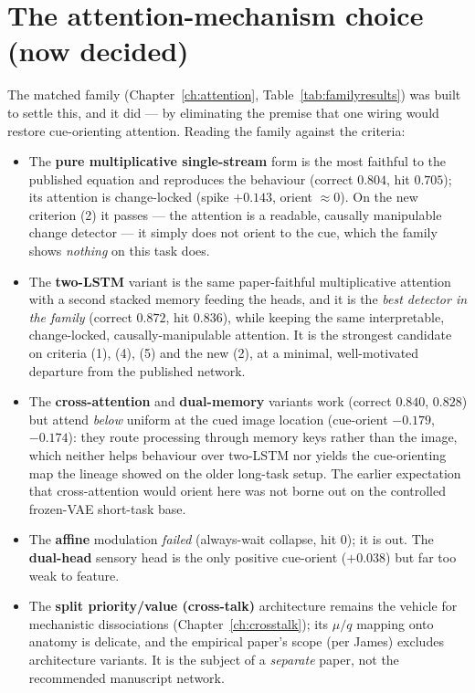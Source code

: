 \section{The attention-mechanism choice (now decided)}
The matched family (Chapter~\ref{ch:attention}, Table~\ref{tab:familyresults}) was built to
settle this, and it did --- by eliminating the premise that one wiring would restore
cue-orienting attention. Reading the family against the criteria:
\begin{itemize}
\item The \textbf{pure multiplicative single-stream} form is the most faithful to the
published equation and reproduces the behaviour (correct $0.804$, hit $0.705$); its
attention is change-locked (spike $+0.143$, orient $\approx0$). On the new criterion (2) it
passes --- the attention is a readable, causally manipulable change detector --- it simply
does not orient to the cue, which the family shows \emph{nothing} on this task does.
\item The \textbf{two-LSTM} variant is the same paper-faithful multiplicative attention with
a second stacked memory feeding the heads, and it is the \emph{best detector in the family}
(correct $0.872$, hit $0.836$), while keeping the same interpretable, change-locked,
causally-manipulable attention. It is the strongest candidate on criteria (1), (4), (5) and
the new (2), at a minimal, well-motivated departure from the published network.
\item The \textbf{cross-attention} and \textbf{dual-memory} variants work (correct $0.840$,
$0.828$) but attend \emph{below} uniform at the cued image location (cue-orient $-0.179$,
$-0.174$): they route processing through memory keys rather than the image, which neither
helps behaviour over two-LSTM nor yields the cue-orienting map the lineage showed on the
older long-task setup. The earlier expectation that cross-attention would orient here was
not borne out on the controlled frozen-VAE short-task base.
\item The \textbf{affine} modulation \emph{failed} (always-wait collapse, hit $0$); it is
out. The \textbf{dual-head} sensory head is the only positive cue-orient ($+0.038$) but far
too weak to feature.
\item The \textbf{split priority/value (cross-talk)} architecture remains the vehicle for
mechanistic dissociations (Chapter~\ref{ch:crosstalk}); its $\mu/q$ mapping onto anatomy is
delicate, and the empirical paper's scope (per James) excludes architecture variants. It is
the subject of a \emph{separate} paper, not the recommended manuscript network.
\end{itemize}

